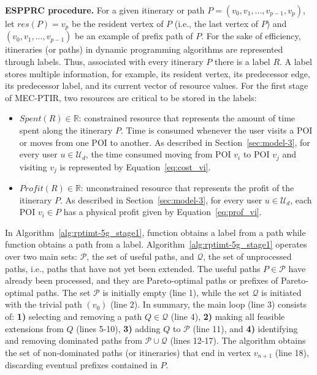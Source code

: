 \noindent\textbf{ESPPRC procedure.} For a given itinerary or path $P = (v_0, v_1, ..., v_{p-1}, v_p)$, let $res(P) = v_p$ be the resident vertex of $P$ (i.e., the last vertex of $P$) and $(v_0, v_1, ..., v_{p-1})$ be an example of prefix path of $P$. For the sake of efficiency, itineraries (or paths) in dynamic programming algorithms are represented through labels. Thus, associated with every itinerary $P$ there is a label $R$. A label stores multiple information, for example, its resident vertex, its predecessor edge, its predecessor label, and its current vector of resource values. For the first stage of MEC-PTIR, two resources are critical to be stored in the labels:
\begin{itemize}
    \item $Spent(R) \in \mathbb{R}$: constrained resource that represents the amount of time spent along the itinerary $P$. Time is consumed whenever the user visits a POI or moves from one POI to another. As described in Section~\ref{sec:model-3}, for every user $u \in \mathcal{U}_d$, the time consumed moving from POI $v_i$ to POI $v_j$ and visiting $v_j$ is represented by Equation~\ref{eq:cost_vi}.
    \item $Profit(R) \in \mathbb{R}$: unconstrained resource that represents the profit of the itinerary $P$. As described in Section~\ref{sec:model-3}, for every user $u \in \mathcal{U}_d$, each POI $v_i \in P$ has a physical profit given by Equation~\ref{eq:prof_vi}.
\end{itemize}

In Algorithm~\ref{alg:rptimt-5g_stage1}, function  obtains a label from a path while function  obtains a path from a label. Algorithm~\ref{alg:rptimt-5g_stage1} operates over two main sets: $\mathcal{P}$, the set of useful paths, and $\mathcal{Q}$, the set of unprocessed paths, i.e., paths that have not yet been extended. The useful paths $P \in \mathcal{P}$ have already been processed, and they are Pareto-optimal paths or prefixes of Pareto-optimal paths. The set $\mathcal{P}$ is initially empty (line 1), while the set $\mathcal{Q}$ is initiated with the trivial path $(v_0)$ (line 2). In summary, the main loop (line 3) consists of: \textbf{1)} selecting and removing a path $Q \in \mathcal{Q}$ (line 4), \textbf{2)} making all feasible extensions from $Q$ (lines 5-10), \textbf{3)} adding $Q$ to $\mathcal{P}$ (line 11), and \textbf{4)} identifying and removing dominated paths from $\mathcal{P} \cup \mathcal{Q}$ (lines 12-17). The algorithm obtains the set of non-dominated paths (or itineraries) that end in vertex $v_{n+1}$ (line 18), discarding eventual prefixes contained in $P$. 

